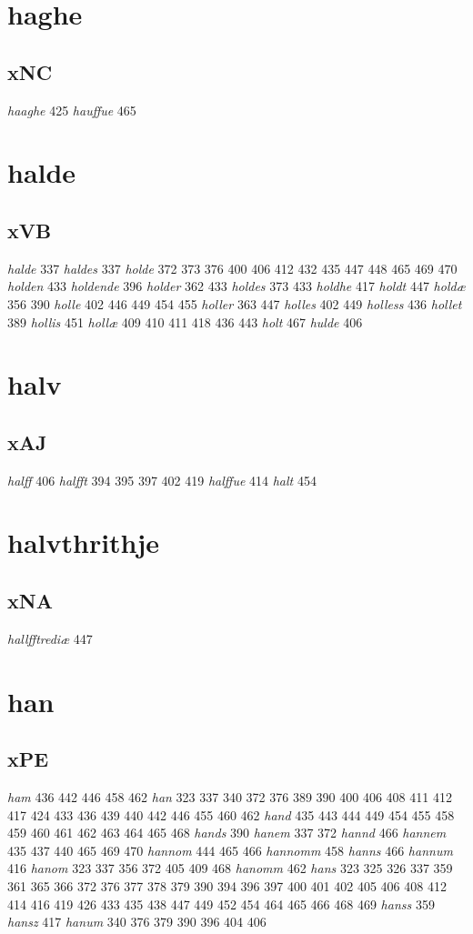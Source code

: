 \documentclass[a4paper,twocolumn]{article}
\begin{document}
\section{haghe}
\label{sec:org2b48be0}
\subsection{xNC}
\label{sec:org1d653d2}
\emph{haaghe} 425 \emph{hauffue} 465 
\section{halde}
\label{sec:orgc9883a3}
\subsection{xVB}
\label{sec:org3236382}
\emph{halde} 337 \emph{haldes} 337 \emph{holde} 372 373 376 400 406 412 432 435 447 448 465 469 470 \emph{holden} 433 \emph{holdende} 396 \emph{holder} 362 433 \emph{holdes} 373 433 \emph{holdhe} 417 \emph{holdt} 447 \emph{holdæ} 356 390 \emph{holle} 402 446 449 454 455 \emph{holler} 363 447 \emph{holles} 402 449 \emph{holless} 436 \emph{hollet} 389 \emph{hollis} 451 \emph{hollæ} 409 410 411 418 436 443 \emph{holt} 467 \emph{hulde} 406 
\section{halv}
\label{sec:orgbd78bcb}
\subsection{xAJ}
\label{sec:org1ca14eb}
\emph{halff} 406 \emph{halfft} 394 395 397 402 419 \emph{halffue} 414 \emph{halt} 454 
\section{halvthrithje}
\label{sec:org2b8b34e}
\subsection{xNA}
\label{sec:org6aaac2f}
\emph{hallfftrediæ} 447 
\section{han}
\label{sec:org1eb745e}
\subsection{xPE}
\label{sec:orgd0d2d79}
\emph{ham} 436 442 446 458 462 \emph{han} 323 337 340 372 376 389 390 400 406 408 411 412 417 424 433 436 439 440 442 446 455 460 462 \emph{hand} 435 443 444 449 454 455 458 459 460 461 462 463 464 465 468 \emph{hands} 390 \emph{hanem} 337 372 \emph{hannd} 466 \emph{hannem} 435 437 440 465 469 470 \emph{hannom} 444 465 466 \emph{hannomm} 458 \emph{hanns} 466 \emph{hannum} 416 \emph{hanom} 323 337 356 372 405 409 468 \emph{hanomm} 462 \emph{hans} 323 325 326 337 359 361 365 366 372 376 377 378 379 390 394 396 397 400 401 402 405 406 408 412 414 416 419 426 433 435 438 447 449 452 454 464 465 466 468 469 \emph{hanss} 359 \emph{hansz} 417 \emph{hanum} 340 376 379 390 396 404 406 
\end{document}
